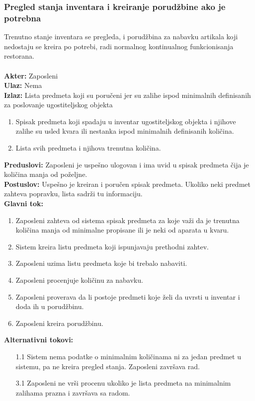 \documentclass{article}
\begin{document}
\subsubsection{Pregled stanja inventara i kreiranje porudžbine ako je potrebna}
Trenutno stanje inventara se pregleda, i porudžbina za nabavku artikala koji nedostaju se kreira po potrebi, radi normalnog kontinualnog funkcionisanja restorana.\\\\
\textbf{Akter:} Zaposleni\\
\textbf{Ulaz:} Nema\\
\textbf{Izlaz:} Lista predmeta koji su poručeni jer su zalihe ispod minimalnih definisanih za poslovanje ugostiteljskog objekta\\
\begin{enumerate}
	\item Spisak predmeta koji spadaju u inventar ugostiteljskog objekta i njihove zalihe su usled kvara ili nestanka ispod minimalnih definisanih količina.
	\item Lista svih predmeta i njihova trenutna količina.
\end{enumerate} 
\textbf{Preduslovi:} Zaposleni je uspešno ulogovan i ima uvid u spisak predmeta čija je količina manja od poželjne.\\
\textbf{Postuslov:} Uspešno je kreiran i poručen spisak predmeta. Ukoliko neki predmet zahteva popravku, lista sadrži tu informaciju.\\
\textbf{Glavni tok:} 
\begin{enumerate}
	\item Zaposleni zahteva od sistema spisak predmeta za koje važi da je trenutna količina manja od minimalne propisane ili je neki od aparata u kvaru.
	\item Sistem kreira listu predmeta koji ispunjavaju prethodni zahtev.
    \item Zaposleni uzima listu predmeta koje bi trebalo nabaviti.
	\item Zaposleni procenjuje količinu za nabavku. 
	\item Zaposleni proverava da li postoje predmeti koje želi da uvrsti u inventar i doda ih u porudžbinu.
	\item Zaposleni kreira porudžbinu.
\end{enumerate}
\textbf{Alternativni tokovi:}
\begin{itemize}
\item [1.1] Sistem nema podatke o minimalnim količinama ni za jedan predmet u sistemu, pa ne kreira pregled stanja. Zaposleni završava rad.
\item [3.1] Zaposleni ne vrši procenu ukoliko je lista predmeta na minimalnim zalihama prazna i završava sa radom.
\end{itemize}
\end{document}
